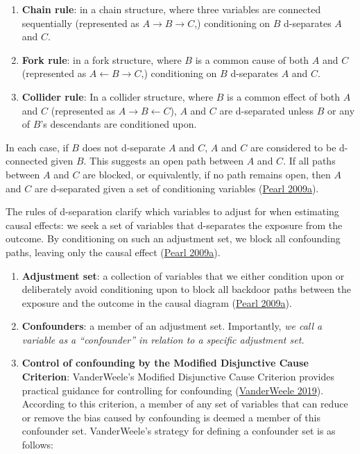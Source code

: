 \documentclass[
  singlecolumn]{article}
\begin{document}
\begin{enumerate}
\def\labelenumi{\alph{enumi}.}
\item
  \textbf{Chain rule}: in a chain structure, where three variables are
  connected sequentially (represented as
  \(A \rightarrow B \rightarrow C\),) conditioning on \(B\) d-separates
  \(A\) and \(C\).
\item
  \textbf{Fork rule}: in a fork structure, where \(B\) is a common cause
  of both \(A\) and \(C\) (represented as
  \(A \leftarrow B \rightarrow C\),) conditioning on \(B\) d-separates
  \(A\) and \(C\).
\item
  \textbf{Collider rule}: In a collider structure, where \(B\) is a
  common effect of both \(A\) and \(C\) (represented as
  \(A \rightarrow B \leftarrow C\)), \(A\) and \(C\) are d-separated
  unless \(B\) or any of \(B\)'s descendants are conditioned upon.
\end{enumerate}

In each case, if \(B\) does not d-separate \(A\) and \(C\), \(A\) and
\(C\) are considered to be d-connected given \(B\). This suggests an
open path between \(A\) and \(C\). If all paths between \(A\) and \(C\)
are blocked, or equivalently, if no path remains open, then \(A\) and
\(C\) are d-separated given a set of conditioning variables
(\protect\hyperlink{ref-pearl2009}{Pearl 2009a}).

The rules of d-separation clarify which variables to adjust for when
estimating causal effects: we seek a set of variables that d-separates
the exposure from the outcome. By conditioning on such an adjustment
set, we block all confounding paths, leaving only the causal effect
(\protect\hyperlink{ref-pearl2009}{Pearl 2009a}).

\begin{enumerate}
\def\labelenumi{\arabic{enumi}.}
\setcounter{enumi}{4}
\item
  \textbf{Adjustment set}: a collection of variables that we either
  condition upon or deliberately avoid conditioning upon to block all
  backdoor paths between the exposure and the outcome in the causal
  diagram (\protect\hyperlink{ref-pearl2009}{Pearl 2009a}).
\item
  \textbf{Confounders}: a member of an adjustment set. Importantly,
  \emph{we call a variable as a ``confounder'' in relation to a specific
  adjustment set.}
\item
  \textbf{Control of confounding by the Modified Disjunctive Cause
  Criterion}: VanderWeele's Modified Disjunctive Cause Criterion
  provides practical guidance for controlling for confounding
  (\protect\hyperlink{ref-vanderweele2019}{VanderWeele 2019}). According
  to this criterion, a member of any set of variables that can reduce or
  remove the bias caused by confounding is deemed a member of this
  confounder set. VanderWeele's strategy for defining a confounder set
  is as follows:
\end{enumerate}
\end{document}
